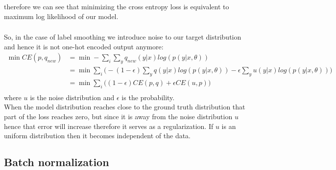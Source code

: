 \documentclass{article}
\begin{document}
therefore we can see that minimizing the cross entropy loss is equivalent to maximum log likelihood of our model.

\subsubsection{}

So, in the case of label smoothing we introduce noise to our target distribution and hence it is not one-hot encoded output anymore:
\begin{align*}
    \min CE(p,q_{new}) &= \min -\sum_{i}\sum_{y}q_{new}(y|x)log(p(y|x,\theta))\\
    &= \min \sum_{i}\Big(-(1-\epsilon)\sum_{y}q(y|x)log(p(y|x,\theta)) -\epsilon\sum_{y}u(y|x)log(p(y|x,\theta))\Big)\\
    &= \min \sum_{i}\Big((1-\epsilon)CE(p,q) + \epsilon CE(u,p) \Big)\\
\end{align*}
where $u$ is the noise distribution and $\epsilon$ is the probability.\\

When the model distribution reaches close to the ground truth distribution that part of the loss reaches zero, but since it is away from the noise distribution $u$ hence that error will increase therefore it serves as a regularization. If $u$ is an uniform distribution then it becomes independent of the data.



\subsection{Batch normalization}
\end{document}
